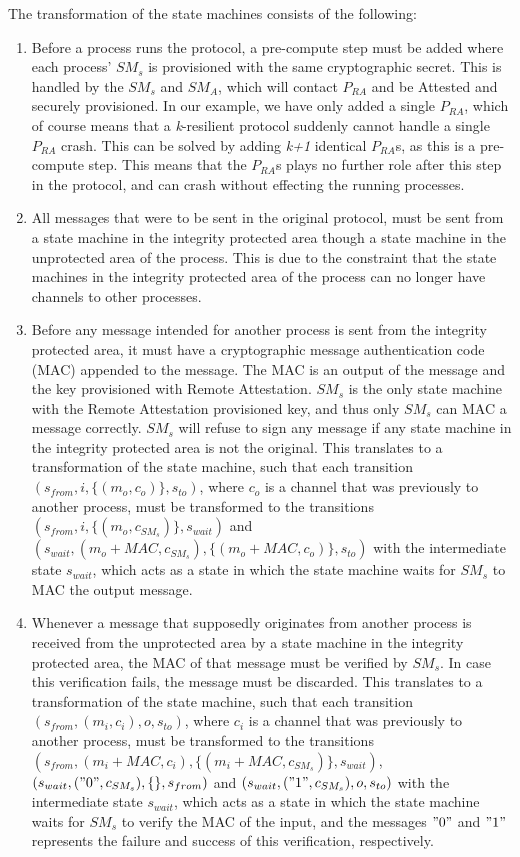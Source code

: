 \documentclass{article}
\begin{document}
	The transformation of the state machines consists of the following:
	\begin{enumerate}
		\item Before a process runs the protocol, a pre-compute step must be added where each process' $SM_s$ is provisioned with the same cryptographic secret.
		This is handled by the $SM_s$ and $SM_A$, which will contact $P_{RA}$ and be Attested and securely provisioned.
		In our example, we have only added a single $P_{RA}$, which of course means that a \textit{k}-resilient protocol suddenly cannot handle a single $P_{RA}$ crash.
		This can be solved by adding \textit{k+1} identical $P_{RA}$s, as this is a pre-compute step.
		This means that the $P_{RA}$s plays no further role after this step in the protocol, and can crash without effecting the running processes.
		\item All messages that were to be sent in the original protocol, must be sent from a state machine in the integrity protected area though a state machine in the unprotected area of the process.
		This is due to the constraint that the state machines in the integrity protected area of the process can no longer have channels to other processes.
		\item Before any message intended for another process is sent from the integrity protected area, it must have a cryptographic message authentication code (MAC) appended to the message.
		The MAC is an output of the message and the key provisioned with Remote Attestation.
		$SM_s$ is the only state machine with the Remote Attestation provisioned key, and thus only $SM_s$ can MAC a message correctly.
		$SM_s$ will refuse to sign any message if any state machine in the integrity protected area is not the original.
		This translates to a transformation of the state machine, such that each transition $(s_{from}, i, \{(m_o, c_o)\}, s_{to})$, where $c_o$ is a channel that was previously to another process, must be transformed to the transitions $(s_{from}, i, \{(m_o, c_{SM_s})\}, s_{wait})$ and $(s_{wait}, (m_o+MAC, c_{SM_s}), \{(m_o+MAC, c_o)\}, s_{to})$ with the intermediate state $s_{wait}$, which acts as a state in which the state machine waits for $SM_s$ to MAC the output message.
		\item Whenever a message that supposedly originates from another process is received from the unprotected area by a state machine in the integrity protected area, the MAC of that message must be verified by $SM_s$.
		In case this verification fails, the message must be discarded.
		This translates to a transformation of the state machine, such that each transition $(s_{from}, (m_i, c_i), o, s_{to})$, where $c_i$ is a channel that was previously to another process, must be transformed to the transitions $(s_{from}, (m_i+MAC, c_i), \{(m_i+MAC, c_{SM_s})\}, s_{wait})$, $(s_{wait}, ("0", c_{SM_s}), \{\}, s_{from})$ and  $(s_{wait}, ("1", c_{SM_s}), o, s_{to})$ with the intermediate state $s_{wait}$, which acts as a state in which the state machine waits for $SM_s$ to verify the MAC of the input, and the messages $"0"$ and $"1"$ represents the failure and success of this verification, respectively.

\end{enumerate}
\end{document}
